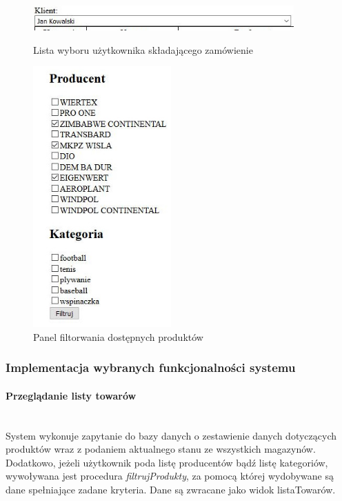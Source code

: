 \documentclass[a4paper, 12pt]{article}
\begin{document}
\begin{figure}[H]
	\centering
	\includegraphics[width=10cm]{Screeny/listaRozwijana.JPG}
	\caption[Lista wyboru użytkownika]{Lista wyboru użytkownika składającego zamówienie}
	\label{fig:listaRozwijana}
	
	\centering
	\includegraphics[height=10cm]{Screeny/panelFiltrowania.JPG}
	\caption[Panel filtorwania dostępnych produktów]{Panel filtorwania dostępnych produktów}
	\label{fig:panelFiltrowaniaProduktów}
\end{figure}

\subsubsection{Implementacja wybranych funkcjonalności systemu}
\paragraph{Przeglądanie listy towarów} \mbox{}\\
System wykonuje zapytanie do bazy danych o zestawienie danych dotyczących produktów wraz z podaniem aktualnego stanu ze wszystkich magazynów. Dodatkowo, jeżeli użytkownik poda listę producentów bądź listę kategoriów, wywoływana jest procedura \textit{filtrujProdukty}, za pomocą której wydobywane są dane spełniające zadane kryteria. Dane są zwracane jako widok listaTowarów.
\end{document}
